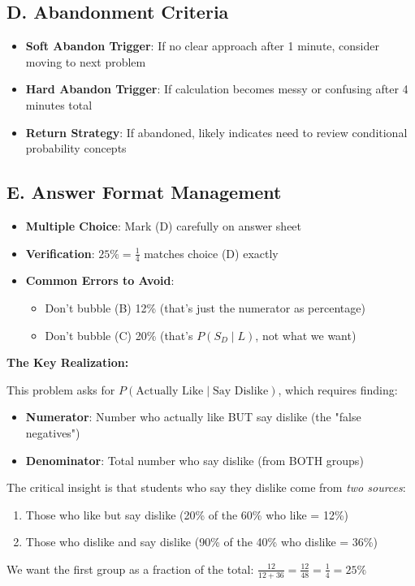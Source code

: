 \documentclass[]{article}
\begin{document}
\begin{competitionbox}
\subsection*{D. Abandonment Criteria}
\begin{itemize}[leftmargin=*]
    \item \textbf{Soft Abandon Trigger}: If no clear approach after 1 minute, consider moving to next problem
    \item \textbf{Hard Abandon Trigger}: If calculation becomes messy or confusing after 4 minutes total
    \item \textbf{Return Strategy}: If abandoned, likely indicates need to review conditional probability concepts
\end{itemize}

\subsection*{E. Answer Format Management}
\begin{itemize}[leftmargin=*]
    \item \textbf{Multiple Choice}: Mark (D) carefully on answer sheet
    \item \textbf{Verification}: $25\% = \frac{1}{4}$ matches choice (D) exactly
    \item \textbf{Common Errors to Avoid}:
    \begin{itemize}
        \item Don't bubble (B) 12\% (that's just the numerator as percentage)
        \item Don't bubble (C) 20\% (that's $P(S_D \mid L)$, not what we want)
    \end{itemize}
\end{itemize}
\end{competitionbox}

\begin{keyinsightbox}
\textbf{The Key Realization:}

This problem asks for $P(\text{Actually Like} \mid \text{Say Dislike})$, which requires finding:
\begin{itemize}
    \item \textbf{Numerator}: Number who actually like BUT say dislike (the "false negatives")
    \item \textbf{Denominator}: Total number who say dislike (from BOTH groups)
\end{itemize}

The critical insight is that students who say they dislike come from \textit{two sources}:
\begin{enumerate}
    \item Those who like but say dislike (20\% of the 60\% who like = 12\%)
    \item Those who dislike and say dislike (90\% of the 40\% who dislike = 36\%)
\end{enumerate}

We want the first group as a fraction of the total: $\frac{12}{12+36} = \frac{12}{48} = \frac{1}{4} = 25\%$
\end{keyinsightbox}
\end{document}
